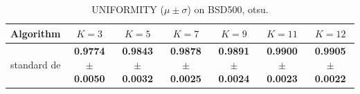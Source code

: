 \begin{table}[htbp]
\centering
\caption{UNIFORMITY ($\mu \pm \sigma$) on BSD500, otsu.}
\label{tab:exp1-otsu-uniformity}
\begin{tabular}{lcccccc}
\toprule
Algorithm & $K=3$ & $K=5$ & $K=7$ & $K=9$ & $K=11$ & $K=12$ \\
\midrule
standard de & \textbf{0.9774 $\pm$ 0.0050} & \textbf{0.9843 $\pm$ 0.0032} & \textbf{0.9878 $\pm$ 0.0025} & \textbf{0.9891 $\pm$ 0.0024} & \textbf{0.9900 $\pm$ 0.0023} & \textbf{0.9905 $\pm$ 0.0022} \\
\bottomrule
\end{tabular}
\end{table}